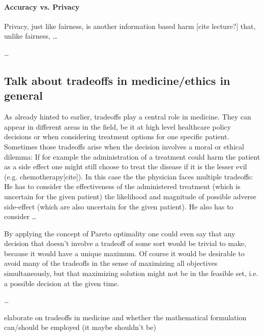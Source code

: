 	\paragraph{Accuracy vs. Privacy}
	Privacy, just like fairness, is another information based harm [cite lecture?] that, unlike fairness, \dots

	\dots



	\subsection{Talk about tradeoffs in medicine/ethics in general}
	As already hinted to earlier, tradeoffs play a central role in medicine.
	They can appear in different areas in the field, be it at high level healthcare policy decisions or when considering treatment options for one specific patient.
	Sometimes those tradeoffs arise when the decision involves a moral or ethical dilemma:
	If for example the administration of a treatment could harm the patient as a side effect one might still choose to treat the disease if it is the lesser evil (e.g. chemotherapy[cite]).
	In this case the the physician faces multiple tradeoffs:
	He has to consider the effectiveness of the administered treatment (which is uncertain for the given patient) the likelihood and magnitude of possible adverse side-effect (which are also uncertain for the given patient).
	He also has to consider \dots
	
	By applying the concept of Pareto optimality one could even say that any decision that doesn't involve a tradeoff of some sort would be trivial to make, because it would have a unique maximum.
	Of course it would be desirable to avoid many of the tradeoffs in the sense of maximizing all objectives simultaneously, but that maximizing solution might not be in the feasible set, i.e. a possible decision at the given time.

	\dots

	elaborate on tradeoffs in medicine and whether the mathematical formulation can/should be employed (it maybe shouldn't be)
